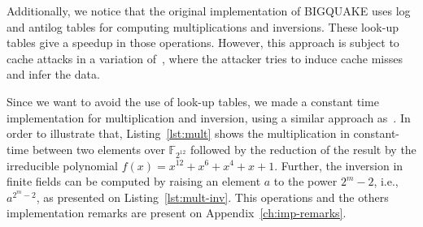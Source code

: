 Additionally, we notice that the original implementation of BIGQUAKE uses log and antilog tables for computing multiplications and inversions. These look-up tables give a speedup in those operations. However, this approach is subject to cache attacks in a variation of~\cite{bruinderink2016flush}, where the attacker tries to induce cache misses and infer the data.

Since we want to avoid the use of look-up tables, we made a constant time implementation for multiplication and inversion, using a similar approach as~\cite{chou2017mcbits}. In order to illustrate that, Listing~\ref{lst:mult} shows the multiplication in constant-time between two elements over $\mathbb{F}_{2^{12}}$ followed by the reduction of the result by the irreducible polynomial $f(x) = x^{12} + x^6 +x^4 +x + 1$. Further, the inversion in finite fields can be computed by raising an element $a$ to the power $2^{m}-2$, i.e., $a^{2^{m}-2}$, as presented on Listing~\ref{lst:mult-inv}. This operations and the others implementation remarks are present on Appendix~\ref{ch:imp-remarks}.



